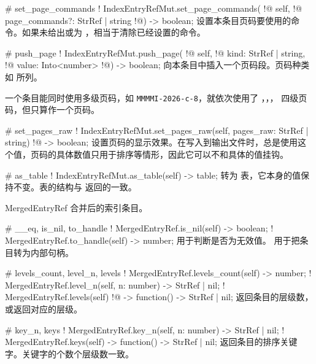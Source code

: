 \documentclass[class=article,doc={kv-usage}]{cusdoc}
\newcommand*\LUA{\texorpdfstring{\textcon{lua}}{lua}}
\begin{document}
\begin{luadoc*}{}
# set_page_commands
! IndexEntryRefMut.set_page_commands(
!@  self,
!@  page_commands?: StrRef | string
!@) -> boolean;
设置本条目页码要使用的命令。如果未给出或为 ，相当于清除已经设置的命令。
\end{luadoc*}

\begin{luadoc*}{}
# push_page
! IndexEntryRefMut.push_page(
!@  self,
!@  kind: StrRef | string,
!@  value: Into<number>
!@) -> boolean;
向本条目中插入一个页码段。页码种类如  所列。

一个条目能同时使用多级页码，如 \texttt{MMMMI-2026-c-8}，就依次使用了 ，，， 四级页码，但只算作一个页码。
\end{luadoc*}

\begin{luadoc*}{}
# set_pages_raw
! IndexEntryRefMut.set_pages_raw(self, pages_raw: StrRef | string)
!@                              -> boolean;
设置页码的显示效果。在写入到输出文件时，总是使用这个值，页码的具体数值只用于排序等情形，因此它可以不和具体的值挂钩。
\end{luadoc*}

\begin{luadoc*}{}
# as_table
! IndexEntryRefMut.as_table(self) -> table;
转为 \LUA 表，它本身的值保持不变。表的结构与  返回的一致。
\end{luadoc*}

\begin{luadoc}[global]{MergedEntryRef}
合并后的索引条目。
\end{luadoc}

\begin{luadoc*}{}
# __eq, is_nil, to_handle
! MergedEntryRef.is_nil(self) -> boolean;
! MergedEntryRef.to_handle(self) -> number;
 用于判断是否为无效值。 用于把条目转为内部句柄。
\end{luadoc*}

\begin{luadoc*}{}
# levels_count, level_n, levels
! MergedEntryRef.levels_count(self) -> number;
! MergedEntryRef.level_n(self, n: number) -> StrRef | nil;
! MergedEntryRef.levels(self)
!@                     -> function() -> StrRef | nil;
返回条目的层级数，或返回对应的层级。
\end{luadoc*}

\begin{luadoc*}{}
# key_n, keys
! MergedEntryRef.key_n(self, n: number) -> StrRef | nil;
! MergedEntryRef.keys(self) -> function() -> StrRef | nil;
返回条目的排序关键字。关键字的个数个层级数一致。
\end{luadoc*}
\end{document}
